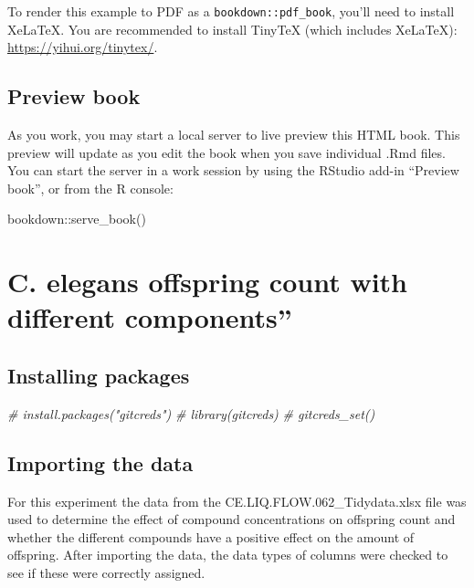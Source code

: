 \documentclass[
]{book}
\newenvironment{Shaded}{\begin{snugshade}}{\end{snugshade}}
\newcommand{\CommentTok}[1]{\textcolor[rgb]{0.56,0.35,0.01}{\textit{#1}}}
\newcommand{\FunctionTok}[1]{\textcolor[rgb]{0.00,0.00,0.00}{#1}}
\newcommand{\NormalTok}[1]{#1}
\newcommand{\SpecialCharTok}[1]{\textcolor[rgb]{0.00,0.00,0.00}{#1}}
\begin{document}
To render this example to PDF as a \texttt{bookdown::pdf\_book}, you'll need to install XeLaTeX. You are recommended to install TinyTeX (which includes XeLaTeX): \url{https://yihui.org/tinytex/}.

\hypertarget{preview-book}{%
\section{Preview book}\label{preview-book}}

As you work, you may start a local server to live preview this HTML book. This preview will update as you edit the book when you save individual .Rmd files. You can start the server in a work session by using the RStudio add-in ``Preview book'', or from the R console:

\begin{Shaded}
\begin{Highlighting}[]
\NormalTok{bookdown}\SpecialCharTok{::}\FunctionTok{serve\_book}\NormalTok{()}
\end{Highlighting}
\end{Shaded}

\hypertarget{c.-elegans-offspring-count-with-different-components}{%
\chapter{C. elegans offspring count with different components''}\label{c.-elegans-offspring-count-with-different-components}}

\hypertarget{installing-packages}{%
\section{Installing packages}\label{installing-packages}}

\begin{Shaded}
\begin{Highlighting}[]
\CommentTok{\# install.packages("gitcreds")}
\CommentTok{\# library(gitcreds)}
\CommentTok{\# gitcreds\_set()}
\end{Highlighting}
\end{Shaded}

\hypertarget{importing-the-data}{%
\section{\texorpdfstring{Importing the data }{Importing the data  }}\label{importing-the-data}}

For this experiment the data from the CE.LIQ.FLOW.062\_Tidydata.xlsx file was used to determine the effect of compound concentrations on offspring count and whether the different compounds have a positive effect on the amount of offspring.
After importing the data, the data types of columns were checked to see if these were correctly assigned.
\end{document}
